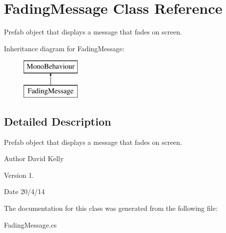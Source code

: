 \hypertarget{class_fading_message}{\section{Fading\-Message Class Reference}
\label{class_fading_message}
}


Prefab object that displays a message that fades on screen.  


Inheritance diagram for Fading\-Message\-:\begin{figure}[H]
\begin{center}
\leavevmode
\includegraphics[height=2.000000cm]{class_fading_message}
\end{center}
\end{figure}


\subsection{Detailed Description}
Prefab object that displays a message that fades on screen. 

\begin{DoxyAuthor}{Author}
David Kelly 
\end{DoxyAuthor}
\begin{DoxyVersion}{Version}
1. 
\end{DoxyVersion}
\begin{DoxyDate}{Date}
20/4/14 
\end{DoxyDate}


The documentation for this class was generated from the following file\-:\begin{DoxyCompactItemize}
\item 
Fading\-Message.\-cs\end{DoxyCompactItemize}
